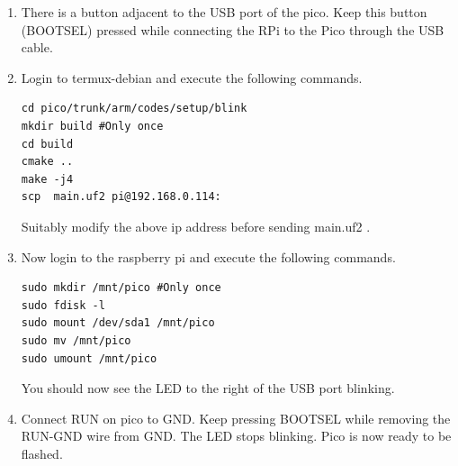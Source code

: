 \begin{enumerate}[label=\arabic*.,ref=\theenumi]

\item  There is a button adjacent to the USB port of the pico.  
Keep this button (BOOTSEL) pressed while connecting the 
RPi to the Pico through the USB cable.
\item Login to termux-debian and execute the following commands.
\begin{lstlisting}
cd pico/trunk/arm/codes/setup/blink
mkdir build #Only once
cd build
cmake ..
make -j4
scp  main.uf2 pi@192.168.0.114:
\end{lstlisting}
Suitably modify the above ip address before sending main.uf2 .
\item Now login to the raspberry pi and execute the following commands.
\begin{lstlisting}
sudo mkdir /mnt/pico #Only once
sudo fdisk -l
sudo mount /dev/sda1 /mnt/pico
sudo mv /mnt/pico
sudo umount /mnt/pico
\end{lstlisting}
You should now see the LED to the right of the USB port blinking.
\item Connect RUN on pico to GND.  Keep pressing BOOTSEL while removing
the RUN-GND wire from GND.  The LED stops blinking.  Pico is now ready to be flashed.
\end{enumerate}
%
